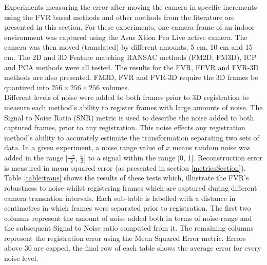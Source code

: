 
Experiments measuring the error after moving the camera in specific increments using the FVR based methods and other methods from the literature are presented in this section. For these experiments, one camera frame of an indoor environment was captured using the Asus Xtion Pro Live active camera. The camera was then moved (translated) by different amounts, 5 cm, 10 cm and 15 cm. The 2D and 3D Feature matching RANSAC methods (FM2D, FM3D), ICP and PCA methods were all tested. The results for the FVR, FFVR and FVR-3D methods are also presented. FM3D, FVR and FVR-3D require the 3D frames be quantized into $256\times 256\times 256$ volumes. \\

Different levels of noise were added to both frames prior to 3D registration to measure each method's ability to register frames with large amounts of noise. The Signal to Noise Ratio (SNR) metric is used to describe the noise added to both captured frames, prior to any registration. This noise effects any registration method's ability to accurately estimate the transformation separating two sets of data. In a given experiment, a noise range value of $x$ means random noise was added in the range [$\frac{-x}{2}$, $\frac{x}{2}$] to a signal within the range [0, 1]. Reconstruction error is measured in mean squared error (as presented in section \ref{metricsSection}). \\

Table \ref{table:trans} shows the results of these tests which, illustrate the FVR's robustness to noise whilst registering frames which are captured during different camera translation intervals. Each sub-table is labelled with a distance in centimetres in which frames were separated prior to registration. The first two columns represent the amount of noise added both in terms of noise-range and the subsequent Signal to Noise ratio computed from it. The remaining columns represent the registration error using the Mean Squared Error metric. Errors above 30 are capped, the final row of each table shows the average error for every noise level. \\

